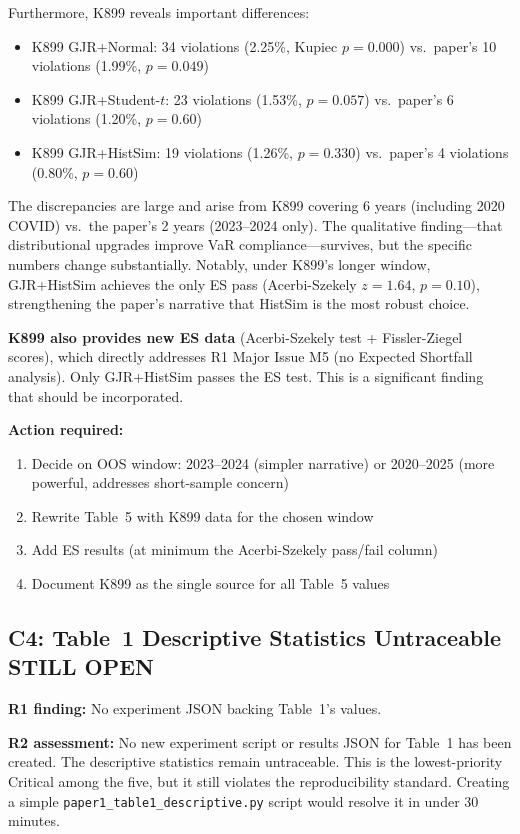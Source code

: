 \documentclass[12pt,a4paper]{article}
\begin{document}
Furthermore, K899 reveals important differences:
\begin{itemize}[nosep]
\item K899 GJR+Normal: 34 violations (2.25\%, Kupiec $p = 0.000$) vs.\ paper's 10 violations (1.99\%, $p = 0.049$)
\item K899 GJR+Student-$t$: 23 violations (1.53\%, $p = 0.057$) vs.\ paper's 6 violations (1.20\%, $p = 0.60$)
\item K899 GJR+HistSim: 19 violations (1.26\%, $p = 0.330$) vs.\ paper's 4 violations (0.80\%, $p = 0.60$)
\end{itemize}
The discrepancies are large and arise from K899 covering 6 years (including 2020 COVID) vs.\ the paper's 2 years (2023--2024 only). The qualitative finding---that distributional upgrades improve VaR compliance---survives, but the specific numbers change substantially. Notably, under K899's longer window, GJR+HistSim achieves the only ES pass (Acerbi-Szekely $z = 1.64$, $p = 0.10$), strengthening the paper's narrative that HistSim is the most robust choice.

\textbf{K899 also provides new ES data} (Acerbi-Szekely test + Fissler-Ziegel scores), which directly addresses R1 Major Issue M5 (no Expected Shortfall analysis). Only GJR+HistSim passes the ES test. This is a significant finding that should be incorporated.

\textbf{Action required:}
\begin{enumerate}[nosep]
\item Decide on OOS window: 2023--2024 (simpler narrative) or 2020--2025 (more powerful, addresses short-sample concern)
\item Rewrite Table~5 with K899 data for the chosen window
\item Add ES results (at minimum the Acerbi-Szekely pass/fail column)
\item Document K899 as the single source for all Table~5 values
\end{enumerate}


\subsection*{C4: Table~1 Descriptive Statistics Untraceable \hfill \textcolor{errorred}{STILL OPEN}}

\textbf{R1 finding:} No experiment JSON backing Table~1's values.

\textbf{R2 assessment:} No new experiment script or results JSON for Table~1 has been created. The descriptive statistics remain untraceable. This is the lowest-priority Critical among the five, but it still violates the reproducibility standard. Creating a simple \texttt{paper1\_table1\_descriptive.py} script would resolve it in under 30 minutes.
\end{document}

